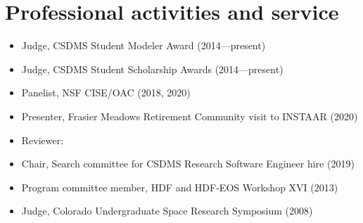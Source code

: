 \section{Professional activities and service}
\vspace{0.5em}

\begin{itemize}

  \item Judge, CSDMS Student Modeler Award (2014---present)

  \item Judge, CSDMS Student Scholarship Awards (2014---present)

  \item Panelist, NSF CISE/OAC (2018, 2020)

  \item Presenter, Frasier Meadows Retirement Community visit to INSTAAR (2020)

  \item Reviewer:

  \item Chair, Search committee for CSDMS Research Software Engineer hire (2019)

  \item Program committee member, HDF and HDF-EOS Workshop XVI (2013)

  \item Judge, Colorado Undergraduate Space Research Symposium (2008)

\end{itemize}
